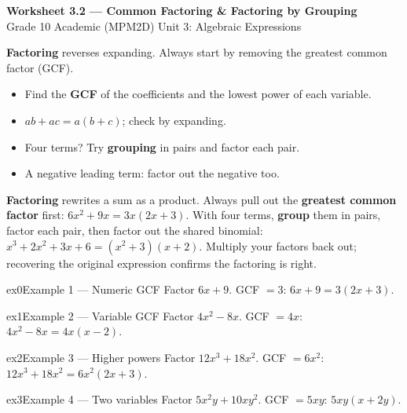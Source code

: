 \documentclass[11pt]{article}
\begin{document}
\begin{center}
{\LARGE\bfseries\color{titleblue}Worksheet 3.2 --- Common Factoring \& Factoring by Grouping}\\[2pt]
{\small Grade 10 Academic (MPM2D) \textperiodcentered{} Unit 3: Algebraic Expressions}
\end{center}

\begin{ideabox}
\textbf{Factoring} reverses expanding. Always start by removing the greatest common factor (GCF).
\begin{itemize}[leftmargin=*,itemsep=2pt]
  \item Find the \textbf{GCF} of the coefficients and the lowest power of each variable.
  \item $ab+ac=a(b+c)$; check by expanding.
  \item Four terms? Try \textbf{grouping} in pairs and factor each pair.
  \item A negative leading term: factor out the negative too.
\end{itemize}
\end{ideabox}

\begin{learnbox}
\textbf{Factoring} rewrites a sum as a product. Always pull out the \textbf{greatest common factor} first: $6x^2+9x=3x(2x+3)$.
With four terms, \textbf{group} them in pairs, factor each pair, then factor out the shared binomial: $x^3+2x^2+3x+6=(x^2+3)(x+2)$.
Multiply your factors back out; recovering the original expression confirms the factoring is right.
\end{learnbox}


\begin{example}{ex0}{Example 1 --- Numeric GCF}
Factor $6x+9$.
\soln GCF $=3$: $6x+9=3(2x+3).$
\end{example}

\begin{example}{ex1}{Example 2 --- Variable GCF}
Factor $4x^2-8x$.
\soln GCF $=4x$: $4x^2-8x=4x(x-2).$
\end{example}

\begin{example}{ex2}{Example 3 --- Higher powers}
Factor $12x^3+18x^2$.
\soln GCF $=6x^2$: $12x^3+18x^2=6x^2(2x+3).$
\end{example}

\begin{example}{ex3}{Example 4 --- Two variables}
Factor $5x^2y+10xy^2$.
\soln GCF $=5xy$: $5xy(x+2y).$
\end{example}
\end{document}
